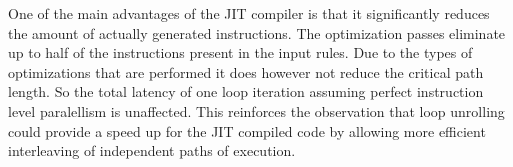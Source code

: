 One of the main advantages of the JIT compiler is that it significantly reduces the amount of actually generated instructions. The optimization passes eliminate up to half of the instructions present in the input rules. Due to the types of optimizations that are performed it does however not reduce the critical path length. So the total latency of one loop iteration assuming perfect instruction level paralellism is unaffected. This reinforces the observation that loop unrolling could provide a speed up for the JIT compiled code by allowing more efficient interleaving of independent paths of execution.



